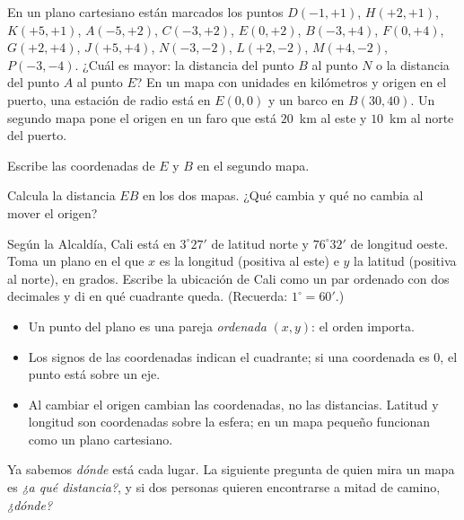 \documentclass[11pt]{article}
\begin{document}
\begin{preguntas}
\pregunta En un plano cartesiano están marcados los puntos $D(-1, +1)$,
$H(+2, +1)$, $K(+5, +1)$, $A(-5, +2)$, $C(-3, +2)$, $E(0, +2)$, $B(-3, +4)$,
$F(0, +4)$, $G(+2, +4)$, $J(+5, +4)$, $N(-3, -2)$, $L(+2, -2)$, $M(+4, -2)$,
$P(-3, -4)$. ¿Cuál es mayor: la distancia del punto $B$ al punto $N$ o la
distancia del punto $A$ al punto $E$?
\espacio{3cm}
\pregunta En un mapa con unidades en kilómetros y origen en el puerto, una
estación de radio está en $E(0, 0)$ y un barco en $B(30, 40)$. Un segundo mapa
pone el origen en un faro que está $20$~km al este y $10$~km al norte del
puerto.
\begin{opciones}
  \item Escribe las coordenadas de $E$ y $B$ en el segundo mapa.
  \item Calcula la distancia $EB$ en los dos mapas. ¿Qué cambia y qué no cambia
        al mover el origen?
\end{opciones}
\espacio{3.5cm}
\pregunta Según la Alcaldía, Cali está en $3^\circ 27'$ de latitud norte y
$76^\circ 32'$ de longitud oeste. Toma un plano en el que $x$ es la longitud
(positiva al este) e $y$ la latitud (positiva al norte), en grados. Escribe la
ubicación de Cali como un par ordenado con dos decimales y di en qué cuadrante
queda. (Recuerda: $1^\circ = 60'$.)
\espacio{2.5cm}
\end{preguntas}

\begin{resumen}
\begin{itemize}
  \item Un punto del plano es una pareja \emph{ordenada} $(x, y)$: el orden
        importa.
  \item Los signos de las coordenadas indican el cuadrante; si una coordenada
        es $0$, el punto está sobre un eje.
  \item Al cambiar el origen cambian las coordenadas, no las distancias.
        Latitud y longitud son coordenadas sobre la esfera; en un mapa pequeño
        funcionan como un plano cartesiano.
\end{itemize}
\end{resumen}

\label{tema:distancia}

\begin{hilo}
Ya sabemos \emph{dónde} está cada lugar. La siguiente pregunta de quien mira un
mapa es \emph{¿a qué distancia?}, y si dos personas quieren encontrarse a mitad
de camino, \emph{¿dónde?}
\end{hilo}
\end{document}
